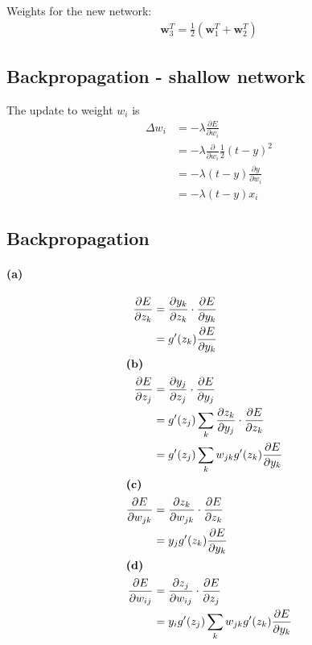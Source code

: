 \documentclass[a4paper,11pt]{article}
\begin{document}
	\noindent Weights for the new network:
	\begin{align*}
		\bm{w}_3^T=\frac{1}{2}(\bm{w}_1^T+\bm{w}_2^T)
	\end{align*}

	\subsection{Backpropagation - shallow network}
	The update to weight $w_i$ is
	\begin{align*}
		\Delta w_i &= -\lambda\frac{\partial E}{\partial w_i} \\
		&= -\lambda \frac{\partial}{\partial w_i}\frac{1}{2}(t-y)^2\\
		&= -\lambda (t-y)\frac{\partial y}{\partial w_i}\\
		&= -\lambda (t-y)x_i
	\end{align*}

	\subsection{Backpropagation}
	\paragraph{(a)}
	\begin{align*}
		\frac{\partial E}{\partial z_k} &= \frac{\partial y_k}{\partial z_k}\cdot\frac{\partial E}{\partial y_k}\\
		&=g'(z_k)\frac{\partial E}{\partial y_k}\\
\intertext{\textbf{(b)}}
		\frac{\partial E}{\partial z_j} &= \frac{\partial y_j}{\partial z_j}\cdot\frac{\partial E}{\partial y_j}\\
		&=g'(z_j)\sum_k\frac{\partial z_k}{\partial y_j}\cdot\frac{\partial E}{\partial z_k}\\
		&=g'(z_j)\sum_kw_{jk}g'(z_k)\frac{\partial E}{\partial y_k}\\
\intertext{\textbf{(c)}}
		\frac{\partial E}{\partial w_{jk}} &= \frac{\partial z_k}{\partial w_{jk}}\cdot\frac{\partial E}{\partial z_k}\\
		&=y_jg'(z_k)\frac{\partial E}{\partial y_k}\\
\intertext{\textbf{(d)}}
		\frac{\partial E}{\partial w_{ij}} &= \frac{\partial z_j}{\partial w_{ij}}\cdot\frac{\partial E}{\partial z_j}\\
		&=y_ig'(z_j)\sum_kw_{jk}g'(z_k)\frac{\partial E}{\partial y_k}
	\end{align*}
\end{document}
